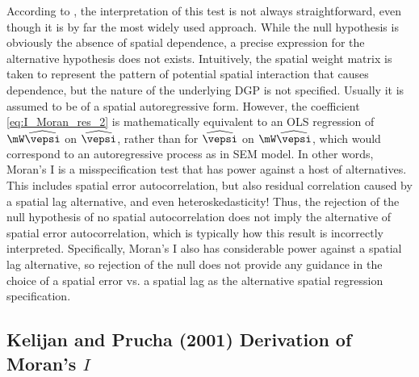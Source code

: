 \documentclass[english,12pt]{book}\usepackage[]{graphicx}\usepackage[]{xcolor}
\begin{document}



According to \citet[][p. 102]{anselin1988spatial}, the interpretation of this test is not always straightforward, even though it is by far the most widely used approach. While the null hypothesis is obviously the absence of spatial dependence, a precise expression for the alternative hypothesis does not exists. Intuitively, the spatial weight matrix is taken to represent the pattern of potential spatial interaction that causes dependence, but the nature of the underlying DGP is not specified. Usually it is assumed to be of a spatial autoregressive form. However, the coefficient \ref{eq:I_Moran_res_2} is mathematically equivalent to an OLS regression of $\mW\widehat{\vepsi}$ on $\widehat{\vepsi}$, rather than for $\widehat{\vepsi}$ on $\mW\widehat{\vepsi}$, which would correspond to an autoregressive process as in SEM model.  In other words, Moran's I is a misspecification test that has power against a host of alternatives. This includes spatial error autocorrelation, but also residual correlation caused by a spatial lag alternative, and even heteroskedasticity!  Thus, the rejection of the null hypothesis of no spatial autocorrelation does not imply the alternative of spatial error autocorrelation, which is typically how this result is incorrectly interpreted. Specifically, Moran's I also has considerable power against a spatial lag alternative, so rejection of the null does not provide any guidance in the choice of a spatial error vs. a spatial lag as the alternative spatial regression specification. 


\subsection{Kelijan and Prucha (2001) Derivation of Moran's $I$}
\end{document}
